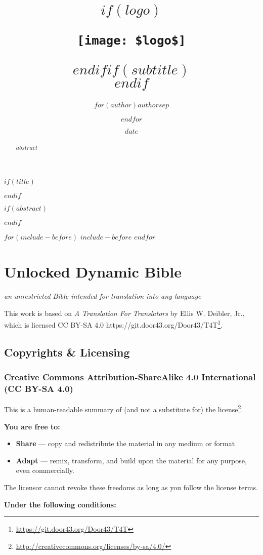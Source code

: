 \documentclass[$fontsize$pt,$if(lang)$$lang$,$endif$$if(papersize)$$papersize$,$endif$$for(classoption)$$classoption$$sep$,$endfor$,openany]{$documentclass$}
\title{$if(logo)$\begin{center}\texttt{[image: \$logo\$]}\end{center}\vspace{\baselineskip}$endif$\Huge $if(subtitle)$\\\vspace{0.5em}{\LARGE }$endif$}
\author{$for(author)$$author$$sep$ \and $endfor$}
\date{\small $date$}
\renewcommand{\href}[2]{#2\footnote{\url{#1}}}
\begin{document}

$if(title)$
  \maketitle
$endif$

$if(abstract)$
  \begin{abstract}
    $abstract$
  \end{abstract}
$endif$

\newpage
{}

$for(include-before)$
  $include-before$
$endfor$

\section{Unlocked Dynamic Bible}

\textit{an unrestricted Bible intended for translation into any language}

This work is based on \textit{A Translation For Translators} by Ellis W. Deibler, Jr., which is licensed CC BY-SA 4.0 \href{https://git.door43.org/Door43/T4T}{https://git.door43.org/Door43/T4T}.

\subsection{Copyrights \& Licensing}\label{copyrights-licensing}

\subsubsection{Creative Commons Attribution-ShareAlike 4.0 International (CC BY-SA 4.0)}

This is a human-readable summary of (and not a substitute for) the \href{http://creativecommons.org/licenses/by-sa/4.0/}{license}.

\textbf{You are free to:}

\begin{itemize}
\item \textbf{Share} — copy and redistribute the material in any medium or format
\item \textbf{Adapt} — remix, transform, and build upon the material for any purpose, even commercially.
\end{itemize}

The licensor cannot revoke these freedoms as long as you follow the license terms.

\textbf{Under the following conditions:}
\end{document}
